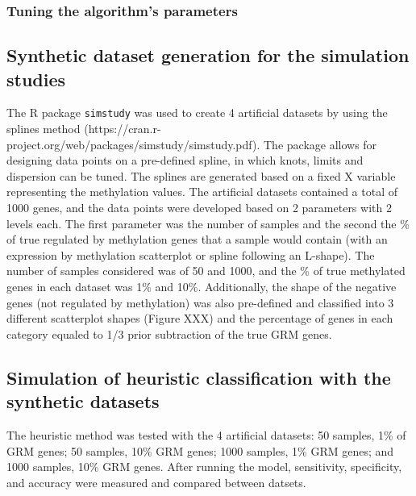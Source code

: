 \documentclass[10pt,letterpaper]{article}
\begin{document}
\hypertarget{tuning-the-algorithms-parameters}{%
\subsubsection{Tuning the algorithm's
parameters}\label{tuning-the-algorithms-parameters}}

\hypertarget{synthetic-dataset-generation-for-the-simulation-studies}{%
\subsection{Synthetic dataset generation for the simulation
studies}\label{synthetic-dataset-generation-for-the-simulation-studies}}

The R package \texttt{simstudy} was used to create 4 artificial datasets
by using the splines method
(https://cran.r-project.org/web/packages/simstudy/simstudy.pdf). The
package allows for designing data points on a pre-defined spline, in
which knots, limits and dispersion can be tuned. The splines are
generated based on a fixed X variable representing the methylation
values. The artificial datasets contained a total of 1000 genes, and the
data points were developed based on 2 parameters with 2 levels each. The
first parameter was the number of samples and the second the \% of true
regulated by methylation genes that a sample would contain (with an
expression by methylation scatterplot or spline following an L-shape).
The number of samples considered was of 50 and 1000, and the \% of true
methylated genes in each dataset was 1\% and 10\%. Additionally, the
shape of the negative genes (not regulated by methylation) was also
pre-defined and classified into 3 different scatterplot shapes (Figure
XXX) and the percentage of genes in each category equaled to 1/3 prior
subtraction of the true GRM genes.

\hypertarget{simulation-of-heuristic-classification-with-the-synthetic-datasets}{%
\subsection{Simulation of heuristic classification with the synthetic
datasets}\label{simulation-of-heuristic-classification-with-the-synthetic-datasets}}

The heuristic method was tested with the 4 artificial datasets: 50
samples, 1\% of GRM genes; 50 samples, 10\% GRM genes; 1000 samples, 1\%
GRM genes; and 1000 samples, 10\% GRM genes. After running the model,
sensitivity, specificity, and accuracy were measured and compared
between datsets.
\end{document}
